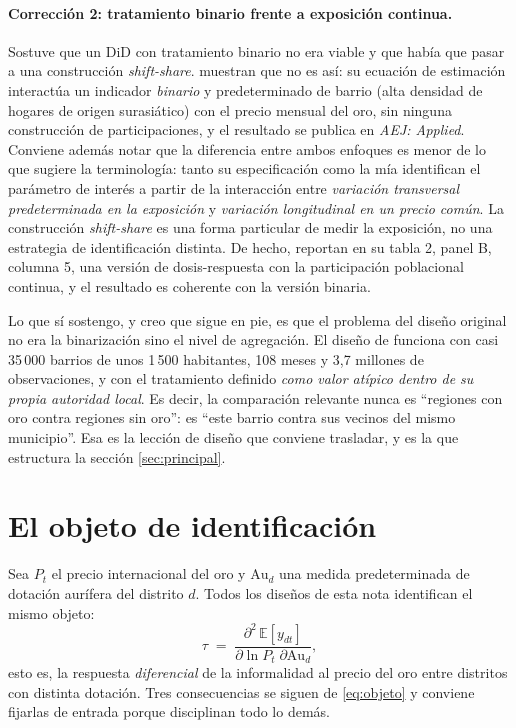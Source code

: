 \documentclass[11pt,a4paper]{article}
\newcommand{\Au}{\mathrm{Au}}
\begin{document}
\paragraph{Corrección 2: tratamiento binario frente a exposición continua.} Sostuve que un DiD con tratamiento binario no era viable y que había que pasar a una construcción \emph{shift-share}. \citet{braakmann2024} muestran que no es así: su ecuación de estimación interactúa un indicador \emph{binario} y predeterminado de barrio (alta densidad de hogares de origen surasiático) con el precio mensual del oro, sin ninguna construcción de participaciones, y el resultado se publica en \emph{AEJ: Applied}. Conviene además notar que la diferencia entre ambos enfoques es menor de lo que sugiere la terminología: tanto su especificación como la mía identifican el parámetro de interés a partir de la interacción entre \emph{variación transversal predeterminada en la exposición} y \emph{variación longitudinal en un precio común}. La construcción \emph{shift-share} es una forma particular de medir la exposición, no una estrategia de identificación distinta. De hecho, \citet{braakmann2024} reportan en su tabla 2, panel B, columna 5, una versión de dosis-respuesta con la participación poblacional continua, y el resultado es coherente con la versión binaria.

Lo que sí sostengo, y creo que sigue en pie, es que el problema del diseño original no era la binarización sino el nivel de agregación. El diseño de \citet{braakmann2024} funciona con casi 35\,000 barrios de unos 1\,500 habitantes, 108 meses y 3{,}7 millones de observaciones, y con el tratamiento definido \emph{como valor atípico dentro de su propia autoridad local}. Es decir, la comparación relevante nunca es ``regiones con oro contra regiones sin oro'': es ``este barrio contra sus vecinos del mismo municipio''. Esa es la lección de diseño que conviene trasladar, y es la que estructura la sección \ref{sec:principal}.

\section{El objeto de identificación}

Sea $P_t$ el precio internacional del oro y $\Au_d$ una medida predeterminada de dotación aurífera del distrito $d$. Todos los diseños de esta nota identifican el mismo objeto:
\begin{equation}
\tau \;=\; \frac{\partial^2 \, \mathbb{E}[y_{dt}]}{\partial \ln P_t \; \partial \Au_d},
\label{eq:objeto}
\end{equation}
esto es, la respuesta \emph{diferencial} de la informalidad al precio del oro entre distritos con distinta dotación. Tres consecuencias se siguen de \eqref{eq:objeto} y conviene fijarlas de entrada porque disciplinan todo lo demás.
\end{document}
